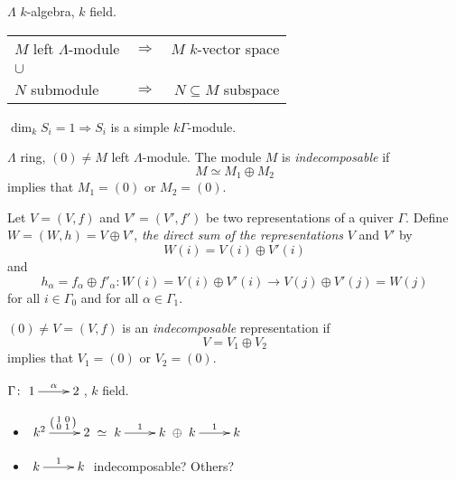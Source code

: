 \begin{recall}
$\Lambda$ $k$-algebra, $k$ field.

\begin{tabular}{lcr}
$M$ left $\Lambda$-module & $\Rightarrow$ & $M$ $k$-vector space\\
 $\cup$ & & \\
$N$ submodule & $\Rightarrow$ & $N\subseteq M$ subspace
\end{tabular}
\end{recall}
\begin{note}
$\dim_k S_i = 1 \Rightarrow S_i$ is a simple $k\Gamma$-module.
\end{note}
\begin{defin}
$\Lambda$ ring, $(0)\neq M$ left $\Lambda$-module.  The module $M$ is
\emph{indecomposable} if 
\[M\simeq M_1\oplus M_2\]
implies that $M_1=(0)$ or $M_2 = (0)$.
\end{defin}
\begin{defin}
Let $V = (V,f)$ and $V' = (V',f')$ be two representations of a quiver
$\Gamma$. Define $W = (W,h) = V \oplus V'$, \emph{the direct sum of
  the representations} $V$ and $V'$ by 
\[W(i) = V(i) \oplus V'(i)\]
and
\[h_\alpha = f_\alpha\oplus f'_\alpha \colon W(i) = V(i)\oplus
  V'(i)\to V(j)\oplus V'(j) = W(j)\]
for all $i\in \Gamma_0$ and for all $\alpha\in\Gamma_1$. 
\end{defin}

\begin{defin}
$(0)\neq V = (V,f)$ is an
\emph{indecomposable}
representation if 
\[V = V_1\oplus V_2\]
implies that $V_1=(0)$ or $V_2 = (0)$. 
\end{defin}

\begin{exam}
$\Gamma\colon \xymatrix{1\ar[r]^\alpha & 2}$, $k$ field.

\begin{itemize}
\item $\xymatrix{k^2\ar[r]^{\left(\begin{smallmatrix}1 & 0 \\ 0 &
          1\end{smallmatrix}\right)} & 2}
\simeq \xymatrix{k\ar[r]^1 & k}\oplus \xymatrix{k\ar[r]^1 & k}$
\item $\xymatrix{k\ar[r]^1 & k}$ indecomposable? Others?
\end{itemize}
\end{exam}

